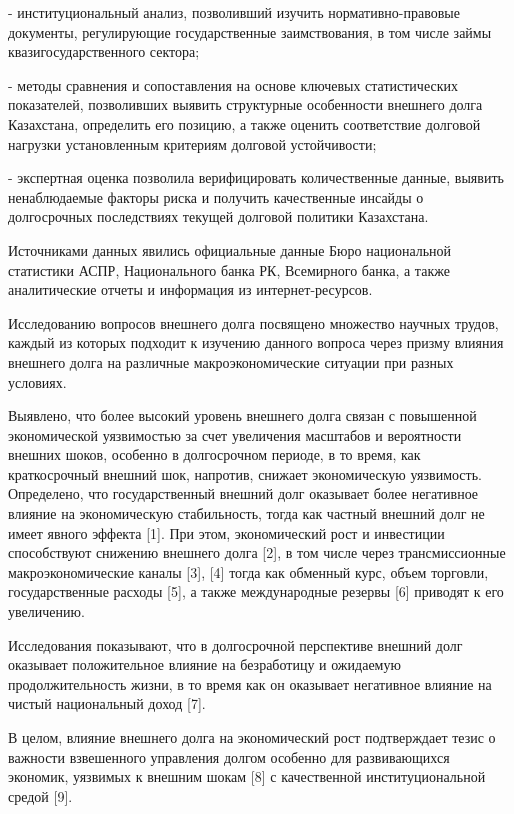 \begin{multicols}{2}
- институциональный анализ, позволивший изучить нормативно-правовые
документы, регулирующие государственные заимствования, в том числе займы
квазигосударственного сектора;

- методы сравнения и сопоставления на основе ключевых статистических
показателей, позволивших выявить структурные особенности внешнего долга
Казахстана, определить его позицию, а также оценить соответствие
долговой нагрузки установленным критериям долговой устойчивости;

- экспертная оценка позволила верифицировать количественные данные,
выявить ненаблюдаемые факторы риска и получить качественные инсайды о
долгосрочных последствиях текущей долговой политики Казахстана.

Источниками данных явились официальные данные Бюро национальной
статистики АСПР, Национального банка РК, Всемирного банка, а также
аналитические отчеты и информация из интернет-ресурсов.

Исследованию вопросов внешнего долга посвящено множество научных трудов,
каждый из которых подходит к изучению данного вопроса через призму
влияния внешнего долга на различные макроэкономические ситуации при
разных условиях.

Выявлено, что более высокий уровень внешнего долга связан с повышенной
экономической уязвимостью за счет увеличения масштабов и вероятности
внешних шоков, особенно в долгосрочном периоде, в то время, как
краткосрочный внешний шок, напротив, снижает экономическую уязвимость.
Определено, что государственный внешний долг оказывает более негативное
влияние на экономическую стабильность, тогда как частный внешний долг не
имеет явного эффекта {[}1{]}. При этом, экономический рост и инвестиции
способствуют снижению внешнего долга {[}2{]}, в том числе через
трансмиссионные макроэкономические каналы {[}3{]}, {[}4{]} тогда как
обменный курс, объем торговли, государственные расходы {[}5{]}, а также
международные резервы {[}6{]} приводят к его увеличению.

Исследования показывают, что в долгосрочной перспективе внешний долг
оказывает положительное влияние на безработицу и ожидаемую
продолжительность жизни, в то время как он оказывает негативное влияние
на чистый национальный доход {[}7{]}.

В целом, влияние внешнего долга на экономический рост подтверждает тезис
о важности взвешенного управления долгом особенно для развивающихся
экономик, уязвимых к внешним шокам {[}8{]} с качественной
институциональной средой {[}9{]}.


\end{multicols}
